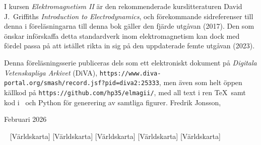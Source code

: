 {  \bigskip{}\medskip\noindent
  I kursen {\it Elektromagnetism II} {\"a}r den rekommenderade kurslitteraturen
  David J.~Griffiths {\it Introduction to Electrodynamics}, och f{\"o}rekommande
  sidreferenser till denna i f{\"o}rel{\"a}sningarna till denna bok g{\"a}ller
  den fj{\"a}rde utg{\aa}van (2017). Den som {\"o}nskar inf{\"o}rskaffa detta
  standardverk inom elektromagnetism kan dock med f{\"o}rdel passa p{\aa} att
  ist{\"a}llet rikta in sig p{\aa} den uppdaterade femte utg{\aa}van (2023).

  \bigskip{}\medskip\noindent
  Denna f{\"o}rel{\"a}sningsserie publiceras dels som ett elektroniskt dokument
  p{\aa} {\it Digitala Vetenskapliga Arkivet} (DiVA),
  {\tt https://www.diva-portal.org/smash/record.jsf?pid=diva2:25333}, men
  {\"a}ven som helt {\"o}ppen k{\"a}ll\-kod p{\aa}
  {\tt https://github.com/hp35/elmagii/}, med all text i ren \TeX\ samt kod
  i \MP\ och Python f{\"o}r generering av samtliga figurer.
  \vskip32pt
  \noindent Fredrik Jonsson,\par
  \noindent Februari 2026}

%
%
%
%
%
%
%
%
%
~\vskip-39mm
\vskip-10mm
[V{\"a}rldskarta]
[V{\"a}rldskarta]
[V{\"a}rldskarta]
[V{\"a}rldskarta]
[V{\"a}rldskarta]
\cleardoublepage

